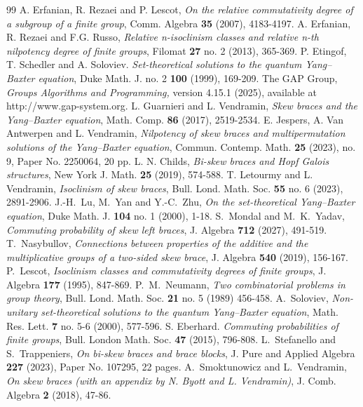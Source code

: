 \documentclass[10pt,a4paper]{amsart}
\numberwithin{equation}{section}
\begin{document}
\begin{thebibliography}{99}
 A. Erfanian, R. Rezaei and P. Lescot, \emph{On the relative commutativity degree of a subgroup of a finite group}, Comm. Algebra {\bf 35} (2007), 4183-4197.
 A. Erfanian, R. Rezaei and F.G. Russo, \emph{Relative n-isoclinism classes and relative n-th nilpotency degree of finite groups}, Filomat {\bf 27} no. 2 (2013), 365-369.
 P. Etingof, T. Schedler and A. Soloviev. {\it Set-theoretical solutions to the quantum Yang--Baxter equation}, Duke Math. J. no. 2 {\bf 100} (1999), 169-209.
 The GAP Group, \emph{Groups Algorithms and Programming,} version 4.15.1 (2025), available at http://www.gap-system.org.
 L. Guarnieri and L. Vendramin, \emph{ Skew braces and the Yang--Baxter equation}, Math. Comp. {\bf 86} (2017), 2519-2534.
 E. Jespers, A. Van Antwerpen and L. Vendramin, \emph{Nilpotency of skew braces and multipermutation solutions of the Yang--Baxter equation}, Commun. Contemp. Math. {\bf 25} (2023), no. 9, Paper No. 2250064, 20 pp.
 L. N. Childs, \emph{Bi-skew braces and Hopf Galois structures}, New York J. Math. {\bf 25} (2019), 574-588.
 T. Letourmy and L. Vendramin, \emph{Isoclinism of skew braces}, Bull. Lond. Math. Soc. {\bf 55} no. 6 (2023), 2891-2906.
 J.-H.~Lu, M.~Yan and Y.-C.~Zhu, \emph{On the set-theoretical Yang--Baxter equation}, Duke Math. J. {\bf 104} no. 1 (2000), 1-18.
 S.~Mondal and M.~K.~Yadav, \emph{Commuting probability of skew left braces}, J. Algebra {\bf 712} (2027), 491-519.
 T.~Nasybullov, \emph{Connections between properties of the additive and the multiplicative groups of a two-sided skew brace}, J. Algebra {\bf 540} (2019), 156-167.
 P.~Lescot, \emph{Isoclinism classes and commutativity degrees of finite groups}, J. Algebra {\bf 177} (1995), 847-869.
 P.~M.~Neumann, \emph{Two combinatorial problems in group theory}, Bull. Lond. Math. Soc. {\bf 21} no. 5 (1989) 456-458.
 A.~Soloviev, \emph{Non-unitary set-theoretical solutions to the quantum Yang--Baxter equation}, Math. Res. Lett. {\bf 7} no. 5-6 (2000), 577-596.
 S. Eberhard. \emph{Commuting probabilities of finite groups}, Bull. London Math. Soc. {\bf 47} (2015), 796-808.
 L.~Stefanello and S.~Trappeniers, \emph{On bi-skew braces and brace blocks}, J. Pure and Applied Algebra {\bf 227} (2023), Paper No. 107295, 22 pages.
 A.~Smoktunowicz and L.~Vendramin, \emph{On skew braces (with an appendix by N. Byott and L. Vendramin)}, J. Comb. Algebra {\bf 2} (2018), 47-86.

\end{thebibliography}
\end{document}
